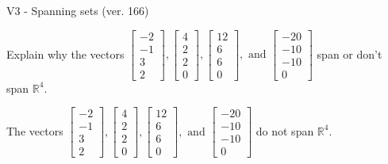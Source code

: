 \begin{exercise}
  \begin{exerciseTitle}V3 - Spanning sets (ver. 166)\end{exerciseTitle}
  \begin{exerciseStatement}
    Explain why the vectors \(\left[\begin{array}{r}
-2 \\
-1 \\
3 \\
2
\end{array}\right] , \left[\begin{array}{r}
4 \\
2 \\
2 \\
0
\end{array}\right] , \left[\begin{array}{r}
12 \\
6 \\
6 \\
0
\end{array}\right] , \text{ and } \left[\begin{array}{r}
-20 \\
-10 \\
-10 \\
0
\end{array}\right]\) span or don't span \(\mathbb{R}^4\). 
	


  \end{exerciseStatement}
  \begin{exerciseAnswer}
   The vectors \(\left[\begin{array}{r}
-2 \\
-1 \\
3 \\
2
\end{array}\right] , \left[\begin{array}{r}
4 \\
2 \\
2 \\
0
\end{array}\right] , \left[\begin{array}{r}
12 \\
6 \\
6 \\
0
\end{array}\right] , \text{ and } \left[\begin{array}{r}
-20 \\
-10 \\
-10 \\
0
\end{array}\right]\) 
  	 do not  
	span \(\mathbb{R}^4\).
  


  \end{exerciseAnswer}
\end{exercise}